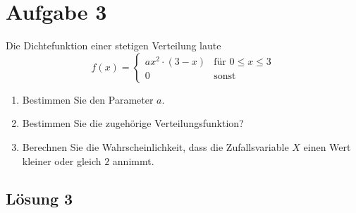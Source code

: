 \documentclass[main.tex]{subfiles}
\begin{document}
\section{Aufgabe 3}
Die Dichtefunktion einer stetigen Verteilung laute
$$ f(x) = \begin{cases}
				a x^2 \cdot (3-x) & \text{für } 0 \leq x \leq 3 \\
				0		  & \text{sonst}
		  \end{cases} $$
\begin{enumerate}
	\item Bestimmen Sie den Parameter $a$.
	\item Bestimmen Sie die zugehörige Verteilungsfunktion?
	\item Berechnen Sie die Wahrscheinlichkeit, dass die Zufallsvariable $X$ einen Wert kleiner oder gleich $2$ annimmt.
\end{enumerate}

\subsection{Lösung 3}
\end{document}
